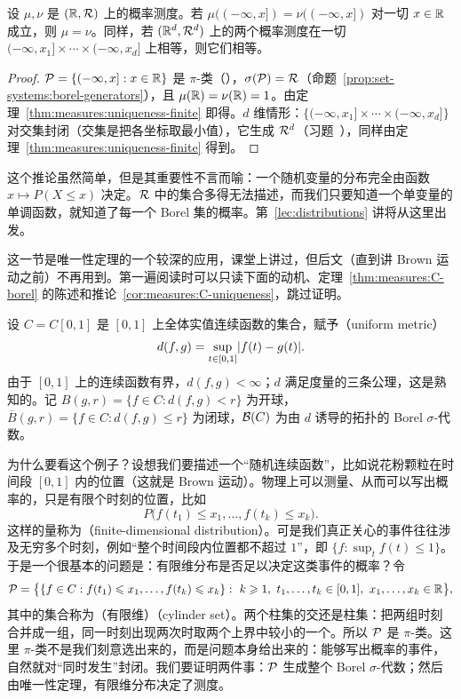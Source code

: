 \begin{corollary}\label{cor:measures:distribution-function}
设 $\mu,\nu$ 是 $(\mathbb{R},\mathcal{R})$ 上的概率测度。若 $\mu((-\infty,x])=\nu((-\infty,x])$ 对一切 $x\in\mathbb{R}$ 成立，则 $\mu=\nu$。同样，若 $(\mathbb{R}^d,\mathcal{R}^d)$ 上的两个概率测度在一切 $(-\infty,x_1]\times\cdots\times(-\infty,x_d]$ 上相等，则它们相等。
\end{corollary}
\begin{proof}
$\mathcal{P}=\{(-\infty,x]:x\in\mathbb{R}\}$ 是 $\pi$-类（），$\sigma(\mathcal{P})=\mathcal{R}$（命题~\ref{prop:set-systems:borel-generators}），且 $\mu(\mathbb{R})=\nu(\mathbb{R})=1$。由定理~\ref{thm:measures:uniqueness-finite} 即得。$d$ 维情形：$\{(-\infty,x_1]\times\cdots\times(-\infty,x_d]\}$ 对交集封闭（交集是把各坐标取最小值），它生成 $\mathcal{R}^d$（习题~），同样由定理~\ref{thm:measures:uniqueness-finite} 得到。
\end{proof}

这个推论虽然简单，但是其重要性不言而喻：一个随机变量的分布完全由函数 $x\mapsto P(X\leqslant x)$ 决定。$\mathcal{R}$ 中的集合多得无法描述，而我们只要知道一个单变量的单调函数，就知道了每一个 Borel 集的概率。第~\ref{lec:distributions} 讲将从这里出发。


这一节是唯一性定理的一个较深的应用，课堂上讲过，但后文（直到讲 Brown 运动之前）不再用到。第一遍阅读时可以只读下面的动机、定理~\ref{thm:measures:C-borel} 的陈述和推论~\ref{cor:measures:C-uniqueness}，跳过证明。

设 $C=C[0,1]$ 是 $[0,1]$ 上全体实值连续函数的集合，赋予（uniform metric）
\[
d(f,g)=\sup_{t\in[0,1]}\lvert f(t)-g(t)\rvert.
\]
由于 $[0,1]$ 上的连续函数有界，$d(f,g)<\infty$；$d$ 满足度量的三条公理，这是熟知的。记 $B(g,r)=\{f\in C:d(f,g)<r\}$ 为开球，$\overline B(g,r)=\{f\in C:d(f,g)\leqslant r\}$ 为闭球，$\mathcal{B}(C)$ 为由 $d$ 诱导的拓扑的 Borel $\sigma$-代数。

为什么要看这个例子？设想我们要描述一个“随机连续函数”，比如说花粉颗粒在时间段 $[0,1]$ 内的位置（这就是 Brown 运动）。物理上可以测量、从而可以写出概率的，只是有限个时刻的位置，比如
\[
P\bigl(f(t_1)\leqslant x_1,\dots,f(t_k)\leqslant x_k\bigr).
\]
这样的量称为（finite-dimensional distribution）。可是我们真正关心的事件往往涉及无穷多个时刻，例如“整个时间段内位置都不超过 $1$”，即 $\{f:\sup_tf(t)\leqslant1\}$。于是一个很基本的问题是：有限维分布是否足以决定这类事件的概率？令
\[
\cP=\bigl\{\{f\in C: f(t_1)\leqslant x_1,\dots,f(t_k)\leqslant x_k\}:\ k\geqslant1,\ t_1,\dots,t_k\in[0,1],\ x_1,\dots,x_k\in\R\bigr\},
\]
其中的集合称为（有限维）（cylinder set）。两个柱集的交还是柱集：把两组时刻合并成一组，同一时刻出现两次时取两个上界中较小的一个。所以 $\mathcal{P}$ 是 $\pi$-类。这里 $\pi$-类不是我们刻意选出来的，而是问题本身给出来的：能够写出概率的事件，自然就对“同时发生”封闭。我们要证明两件事：$\mathcal{P}$ 生成整个 Borel $\sigma$-代数；然后由唯一性定理，有限维分布决定了测度。

